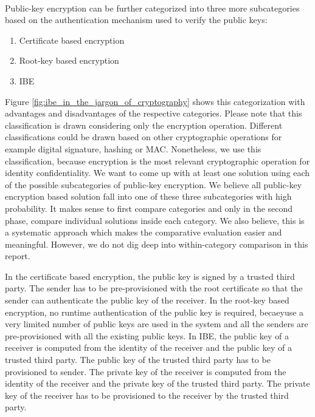 \documentclass[12pt]{llncs}
\begin{document}
\paragraph{}
Public-key encryption can be further categorized into three more subcategories based on the authentication mechanism used to verify the public keys:
\begin{enumerate}
\item Certificate based encryption
\item Root-key based encryption
\item IBE
\end{enumerate} 
Figure \ref{fig:ibe_in_the_jargon_of_cryptography} shows this categorization with advantages and disadvantages of the respective categories. Please note that this classification is drawn considering only the encryption operation. Different classifications could be drawn based on other cryptographic operations for example digital signature, hashing or MAC. Nonetheless, we use this classification, because encryption is the most relevant cryptographic operation for identity confidentiality. We want to come up with at least one solution using each of the possible subcategories of public-key encryption. We believe all public-key encryption based solution fall into one of these three subcategories with high probability. It makes sense to first compare categories and only in the second phase, compare individual solutions inside each category. We also believe, this is a systematic approach which makes the comparative evaluation easier and meaningful.
However, we do not dig deep into within-category comparison in this report.

In the certificate based encryption, the public key is signed by a trusted third party. The sender has to be pre-provisioned with the root certificate so that the sender can authenticate the public key of the receiver. In the root-key based encryption, no runtime authentication of the public key is required, becaeyuse a very limited number of public keys are used in the system and all the senders are pre-provisioned with all the existing public keys. In IBE, the public key of a receiver is computed from the identity of the receiver and the public key of a trusted third party. The public key of the trusted third party has to be provisioned to sender. The private key of the receiver is computed from the identity of the receiver and the private key of the trusted third party. The private key of the receiver has to be provisioned to the receiver by the trusted third party.
\end{document}
